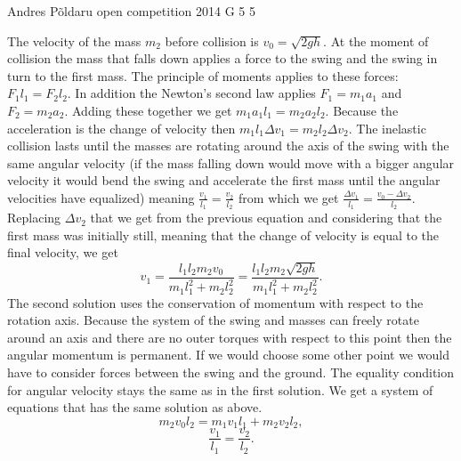 \documentclass[11pt]{article}
\begin{document}
{Andres Põldaru} %
{open competition} %
{2014} %
{G 5} %
{5} %
{

\ifEngSolution
The velocity of the mass $m_2$ before collision is $v_0=\sqrt{2gh}$. At the moment of collision the mass that falls down applies a force to the swing and the swing in turn to the first mass. The principle of moments applies to these forces:  $F_1l_1=F_2l_2$. In addition the Newton’s second law applies $F_1=m_1a_1$ and $F_2=m_2a_2$. Adding these together we get $m_1a_1l_1=m_2a_2l_2$. Because the acceleration is the change of velocity then $m_1l_1\Delta v_1=m_2l_2\Delta v_2$. The inelastic collision lasts until the masses are rotating around the axis of the swing with the same angular velocity (if the mass falling down would move with a bigger angular velocity it would bend the swing and accelerate the first mass until the angular velocities have equalized) meaning $\frac{v_1}{l_1}=\frac{v_2}{l_2}$ from which we get $\frac{\Delta v_1}{l_1}=\frac{v_0-\Delta v_2}{l_2}$. Replacing $\Delta v_2$ that we get from the previous equation and considering that the first mass was initially still, meaning that the change of velocity is equal to the final velocity, we get
\[
v_1=\frac{l_1l_2m_2v_0}{m_1l_1^2+m_2l_2^2}=\frac{l_1l_2m_2\sqrt{2gh}}{m_1l_1^2+m_2l_2^2}.
\] 
The second solution uses the conservation of momentum with respect to the rotation axis. Because the system of the swing and masses can freely rotate around an axis and there are no outer torques with respect to this point then the angular momentum is permanent. If we would choose some other point we would have to consider forces between the swing and the ground. The equality condition for angular velocity stays the same as in the first solution. We get a system of equations that has the same solution as above.
\[
 m_2v_0l_2=m_1v_1l_1+m_2v_2l_2,
\] 
\[
\frac{v_1}{l_1}=\frac{v_2}{l_2}.
\]
\fi
}
\end{document}
